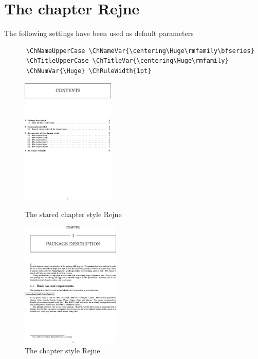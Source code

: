 \documentclass{report}
\begin{document}
    \section{The chapter Rejne}
    The following settings have been used as default parameters\\
    {\small\begin{verbatim}  
      \ChNameUpperCase \ChNameVar{\centering\Huge\rmfamily\bfseries}
      \ChTitleUpperCase \ChTitleVar{\centering\Huge\rmfamily}
      \ChNumVar{\Huge} \ChRuleWidth{1pt}
   \end{verbatim}}
    \begin{figure}[h]
      \begin{minipage}{7 cm}
        \centerline{\includegraphics[height=6cm]{Rejnes.eps}}
        \caption{The stared chapter style Rejne}
      \end{minipage}\hfill
      \begin{minipage}{7 cm}
        \centerline{\includegraphics[height=6cm]{Rejne.eps}}
        \caption{The chapter style Rejne}
      \end{minipage}\hfill
    \end{figure}
\end{document}

